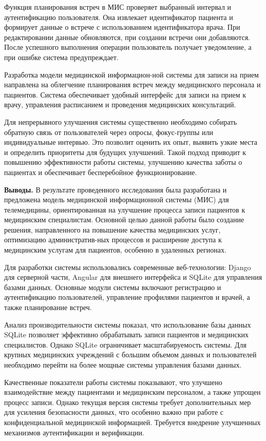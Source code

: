 \begin{multicols}{2}


Функция планирования встреч в МИС проверяет выбранный интервал и
аутентификацию пользователя. Она извлекает идентификатор пациента и
формирует данные о встрече с использованием идентификатора врача. При
редактировании данные обновляются, при создании встречи они добавляются.
После успешного выполнения операции пользователь получает уведомление, а
при ошибке система предупреждает.

Разработка модели медицинской информацион-ной системы для записи на прием
направлена на облегчение планирования встреч между медицинского
персонала и пациентов. Система обеспечивает удобный интерфейс для записи
на прием к врачу, управления расписанием и проведения медицинских
консультаций.

Для непрерывного улучшения системы существенно необходимо собирать
обратную связь от пользователей через опросы, фокус-группы или
индивидуальные интервью. Это позволит оценить их опыт, выявить узкие
места и определить приоритеты для будущих улучшений. Такой подход
приводит к повышению эффективности работы системы, улучшению качества
заботы о пациентах и обеспечивает бесперебойное функционирование.

{\bfseries Выводы.} В результате проведенного исследования была разработана
и предложена модель медицинской информационной системы (МИС) для
телемедицины, ориентированная на улучшение процесса записи пациентов к
медицинским специалистам. Основной целью данной работы было создание
решения, направленного на повышение качества медицинских услуг,
оптимизацию административ-ных процессов и расширение доступа к
медицинским услугам для пациентов, особенно в удаленных регионах.

Для разработки системы использовались современные веб-технологии: Django
для серверной части, Angular для внешнего интерфейса и SQLite для
управления базами данных. Основные модули системы включают регистрацию и
аутентификацию пользователей, управление профилями пациентов и врачей, а
также планирование встреч.

Анализ производительности системы показал, что использование базы данных
SQLite позволяет эффективно обрабатывать записи пациентов и медицинских
специалистов. Однако SQLite ограничивает масштабируемость системы. Для
крупных медицинских учреждений с большим объемом данных и пользователей
необходимо перейти на более мощные системы управления базами данных.

Качественные показатели работы системы показывают, что улучшено
взаимодействие между пациентами и медицинским персоналом, а также
упрощен процесс записи. Однако текущая версия системы требует
дополнительных мер для усиления безопасности данных, что особенно важно
при работе с конфиденциальной медицинской информацией. Требуется
внедрение улучшенных механизмов аутентификации и верификации.


\end{multicols}
